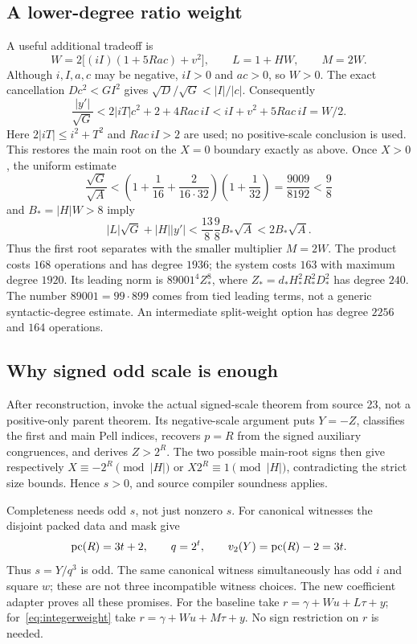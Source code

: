 \documentclass[11pt]{article}
\begin{document}
\subsection{A lower-degree ratio weight}
A useful additional tradeoff is
\[
 W=2\bigl[(iI)(1+5Rac)+v^2\bigr],\qquad L=1+HW,\qquad M=2W.
\tag{5}\label{eq:integerweight}
\]
Although $i,I,a,c$ may be negative, $iI>0$ and $ac>0$, so $W>0$.
The exact cancellation $Dc^2<GI^2$ gives
$\sqrt D/\sqrt G<|I|/|c|$. Consequently
\[
 \frac{|y'|}{\sqrt G}
 <2|iT|c^2+2+4Rac\,iI
 <iI+v^2+5Rac\,iI=W/2.
\]
Here $2|iT|\le i^2+T^2$ and $Rac\,iI>2$ are used; no positive-scale
conclusion is used. This restores the main root on the $X=0$ boundary
exactly as above. Once $X>0$, the uniform estimate
\[
 \frac{\sqrt G}{\sqrt A}
 <\left(1+\frac1{16}+\frac2{16\cdot32}\right)
   \left(1+\frac1{32}\right)=\frac{9009}{8192}<\frac98
\]
and $B_*=|H|W>8$ imply
\[
 |L|\sqrt G+|H||y'|
 <\frac{13}{8}\frac98 B_*\sqrt A<2B_*\sqrt A.
\]
Thus the first root separates with the smaller multiplier $M=2W$.
The product costs $168$ operations and has degree $1936$; the system costs
$163$ with maximum degree $1920$. Its leading norm is
$89001^4Z_*^8$, where $Z_*=d_*H_*^2R_*^2D_*^2$ has degree $240$.
The number $89001=99\cdot899$ comes from tied leading terms, not a generic
syntactic-degree estimate. An intermediate split-weight option has degree
$2256$ and $164$ operations.

\subsection{Why signed odd scale is enough}
After reconstruction, invoke the actual signed-scale theorem from source 23,
not a positive-only parent theorem. Its negative-scale argument puts
$Y=-Z$, classifies the first and main Pell indices, recovers $p=R$ from the
signed auxiliary congruences, and derives $Z>2^R$. The two possible main-root
signs then give respectively
$X\equiv-2^R\pmod{|H|}$ or $X2^R\equiv1\pmod{|H|}$, contradicting the
strict size bounds. Hence $s>0$, and source compiler soundness applies.

Completeness needs odd $s$, not just nonzero $s$. For canonical witnesses
the disjoint packed data and mask give
\[
 \operatorname{pc}(R)=3t+2,\qquad q=2^t,\qquad v_2(Y)=\operatorname{pc}(R)-2=3t.
\]
Thus $s=Y/q^3$ is odd. The same canonical witness simultaneously has odd
$i$ and square $w$; these are not three incompatible witness choices.
The new coefficient adapter proves all these promises. For the baseline
take $r=\gamma+Wu+L\tau+y$; for~\eqref{eq:integerweight} take
$r=\gamma+Wu+M\tau+y$. No sign restriction on $r$ is needed.
\end{document}
